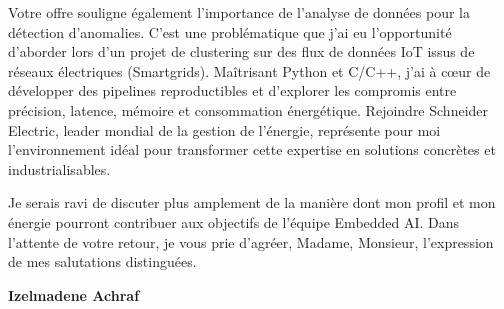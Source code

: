 \documentclass[10pt,a4paper]{../../templates/altacv}
\begin{document}
\vspace{0.4cm}

Votre offre souligne également l'importance de l'analyse de données pour la détection d'anomalies. C'est une problématique que j'ai eu l'opportunité d'aborder lors d'un projet de clustering sur des flux de données IoT issus de réseaux électriques (Smartgrids). Maîtrisant Python et C/C++, j'ai à cœur de développer des pipelines reproductibles et d'explorer les compromis entre précision, latence, mémoire et consommation énergétique. Rejoindre Schneider Electric, leader mondial de la gestion de l'énergie, représente pour moi l'environnement idéal pour transformer cette expertise en solutions concrètes et industrialisables.

\vspace{0.4cm}

Je serais ravi de discuter plus amplement de la manière dont mon profil et mon énergie pourront contribuer aux objectifs de l'équipe Embedded AI. Dans l'attente de votre retour, je vous prie d'agréer, Madame, Monsieur, l'expression de mes salutations distinguées.

\vfill

\begin{flushright}
  \Large\color{emphasis}\textbf{Izelmadene Achraf}
\end{flushright}
\end{document}
